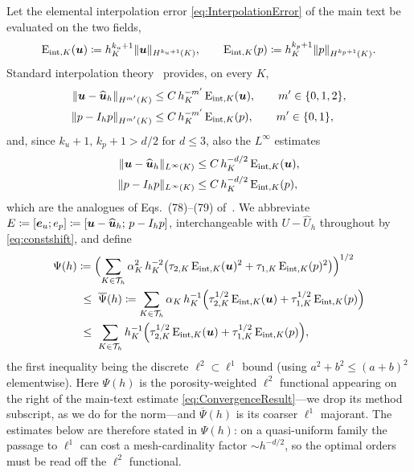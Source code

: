 Let the elemental interpolation error
\cref{eq:InterpolationError} of the main text be evaluated on the two fields,
\begin{equation}\label{eq:Eint}
  \mathrm{E}_{\mathrm{int},K}(\boldsymbol{u})\coloneqq h_K^{k_u+1}\lVert\boldsymbol{u}\rVert_{H^{k_u+1}(K)},
  \qquad
  \mathrm{E}_{\mathrm{int},K}(p)\coloneqq h_K^{k_p+1}\lVert p\rVert_{H^{k_p+1}(K)} .
\end{equation}
Standard interpolation theory~\cite{brenner2008mathematical,ernguermond} provides, on every $K$,
\begin{equation}\label{eq:interp}
\begin{aligned}
  \lVert\boldsymbol{u}-\widehat{\boldsymbol{u}}_h\rVert_{H^{m'}(K)} &\le C\,h_K^{-m'}\,\mathrm{E}_{\mathrm{int},K}(\boldsymbol{u}),
  \qquad m'\in\{0,1,2\},\\
  \lVert p-I_h p\rVert_{H^{m'}(K)} &\le C\,h_K^{-m'}\,\mathrm{E}_{\mathrm{int},K}(p),
  \qquad m'\in\{0,1\},
\end{aligned}
\end{equation}
and, since $k_u+1,\,k_p+1>d/2$ for $d\le3$, also the $L^\infty$ estimates
\begin{equation}\label{eq:interpinfty}
\begin{aligned}
  \lVert\boldsymbol{u}-\widehat{\boldsymbol{u}}_h\rVert_{L^\infty(K)} &\le C\,h_K^{-d/2}\,\mathrm{E}_{\mathrm{int},K}(\boldsymbol{u}),\\
  \lVert p-I_h p\rVert_{L^\infty(K)} &\le C\,h_K^{-d/2}\,\mathrm{E}_{\mathrm{int},K}(p),
\end{aligned}
\end{equation}
which are the analogues of Eqs.~(78)--(79) of~\cite{codina2001stabilized}. We abbreviate
$E\coloneqq[\boldsymbol{e}_{u};e_p]\coloneqq[\boldsymbol{u}-\widehat{\boldsymbol{u}}_h;\,p-I_h p]$, interchangeable with $U-\widehat{U}_h$
throughout by \eqref{eq:constshift}, and define
\begin{equation}\label{eq:psih}
\begin{aligned}
  \Psi(h)
  &\coloneqq \Bigl(\sum_{K\in\mathcal{T}_h}\alpha_K^2\,h_K^{-2}
  \bigl(\tau_{2,K}\,\mathrm{E}_{\mathrm{int},K}(\boldsymbol{u})^2+\tau_{1,K}\,\mathrm{E}_{\mathrm{int},K}(p)^2\bigr)\Bigr)^{1/2} \\
  &\;\le\;
  \overline{\Psi}(h) \coloneqq \sum_{K\in\mathcal{T}_h}\alpha_K\,h_K^{-1}
  \Bigl(\tau_{2,K}^{1/2}\,\mathrm{E}_{\mathrm{int},K}(\boldsymbol{u})+\tau_{1,K}^{1/2}\,\mathrm{E}_{\mathrm{int},K}(p)\Bigr) \\
  &\;\le\;
  \sum_{K\in\mathcal{T}_h}h_K^{-1}
  \Bigl(\tau_{2,K}^{1/2}\,\mathrm{E}_{\mathrm{int},K}(\boldsymbol{u})+\tau_{1,K}^{1/2}\,\mathrm{E}_{\mathrm{int},K}(p)\Bigr),
\end{aligned}
\end{equation}
the first inequality being the discrete $\ell^2\subset\ell^1$ bound (using
$a^2+b^2\le(a+b)^2$ elementwise). Here $\Psi(h)$ is the porosity{\hyp}weighted $\ell^2$
functional appearing on the right of the main{\hyp}text estimate \eqref{eq:ConvergenceResult}---we
drop its method subscript, as we do for the norm---and $\overline{\Psi}(h)$ is its coarser
$\ell^1$ majorant. The estimates below are therefore stated in
$\Psi(h)$: on a quasi{\hyp}uniform family the passage to $\ell^1$ can cost a mesh{\hyp}cardinality
factor $\sim h^{-d/2}$, so the optimal orders must be read off the $\ell^2$ functional.

